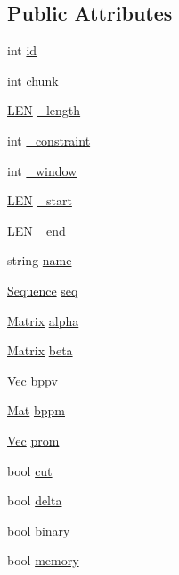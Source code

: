 \subsection*{Public Attributes}
\begin{DoxyCompactItemize}
\item 
int \hyperlink{class_rfold_1_1_paraso_r_a707ccdcc12115fbe06a923fb21e58c06}{id}
\item 
int \hyperlink{class_rfold_1_1_paraso_r_aafdf04b7ad506cfa1457bfefa3423e31}{chunk}
\item 
\hyperlink{energy__const_8hh_a05b49c662c073f89e86804f7856622a0}{L\+E\+N} \hyperlink{class_rfold_1_1_paraso_r_afcca775aebec2ac5d0f659ddb4f625c3}{\+\_\+length}
\item 
int \hyperlink{class_rfold_1_1_paraso_r_a869ef980793c7a669a5b89efdc107db5}{\+\_\+constraint}
\item 
int \hyperlink{class_rfold_1_1_paraso_r_a6b2fc60e2c500a03bf48d442cb11002c}{\+\_\+window}
\item 
\hyperlink{energy__const_8hh_a05b49c662c073f89e86804f7856622a0}{L\+E\+N} \hyperlink{class_rfold_1_1_paraso_r_a213a200c99cd89cf6a41715b9d1b4b05}{\+\_\+start}
\item 
\hyperlink{energy__const_8hh_a05b49c662c073f89e86804f7856622a0}{L\+E\+N} \hyperlink{class_rfold_1_1_paraso_r_aa0a39f36fc4917382d6e95174150791f}{\+\_\+end}
\item 
string \hyperlink{class_rfold_1_1_paraso_r_a52b17c1475bc8319251b6fbde1a5a6d9}{name}
\item 
\hyperlink{class_rfold_1_1_parameter_1_1_sequence}{Sequence} \hyperlink{class_rfold_1_1_paraso_r_a5f61516d848cce0e2a93b2d3e22f63ea}{seq}
\item 
\hyperlink{class_rfold_1_1_matrix}{Matrix} \hyperlink{class_rfold_1_1_paraso_r_a9f5a209eb1cd9de0f4f01c23f4f5e111}{alpha}
\item 
\hyperlink{class_rfold_1_1_matrix}{Matrix} \hyperlink{class_rfold_1_1_paraso_r_a4ebc3071b4f1aa34c75af71d88cf7382}{beta}
\item 
\hyperlink{namespace_rfold_aaf02f2c0c40c1dd572dbdd8bc1bde67d}{Vec} \hyperlink{class_rfold_1_1_paraso_r_a34ad7bc233e6711a93c7cb69c8ed9855}{bppv}
\item 
\hyperlink{namespace_rfold_a6392dbfbc164230455fdcdb1a0ff53d7}{Mat} \hyperlink{class_rfold_1_1_paraso_r_a0372b87e995aa99226a2e5c0bda44800}{bppm}
\item 
\hyperlink{namespace_rfold_aaf02f2c0c40c1dd572dbdd8bc1bde67d}{Vec} \hyperlink{class_rfold_1_1_paraso_r_ad4b227950cd3ec1df3581d9c474777e5}{prom}
\item 
bool \hyperlink{class_rfold_1_1_paraso_r_afd1dd1d5fccc77e48fa36bb090be6735}{cut}
\item 
bool \hyperlink{class_rfold_1_1_paraso_r_ac0a808250ee05c1f56b5be32d867f11e}{delta}
\item 
bool \hyperlink{class_rfold_1_1_paraso_r_af2bb3eef2ea5d6f92d490f2a36c8ab64}{binary}
\item 
bool \hyperlink{class_rfold_1_1_paraso_r_aac983ca08d7d6efbca76b6575ee839e2}{memory}
\end{DoxyCompactItemize}
